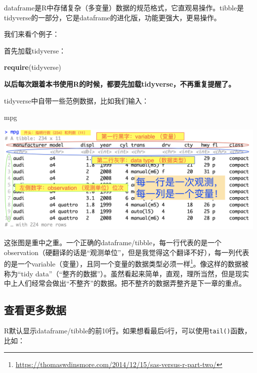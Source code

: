 \documentclass[]{book}
\newenvironment{Shaded}{\begin{snugshade}}{\end{snugshade}}
\newcommand{\KeywordTok}[1]{\textcolor[rgb]{0.13,0.29,0.53}{\textbf{#1}}}
\newcommand{\NormalTok}[1]{#1}
\let\rmarkdownfootnote\footnote%
\def\footnote{\protect\rmarkdownfootnote}
\begin{document}
dataframe是R中存储复杂（多变量）数据的规范格式，它直观易操作。tibble是tidyverse的一部分，它是dataframe的进化版，功能更强大，更易操作。

我们来看个例子：

首先加载tidyverse：

\begin{Shaded}
\begin{Highlighting}[]
\KeywordTok{require}\NormalTok{(tidyverse)}
\end{Highlighting}
\end{Shaded}

\textbf{以后每次跟着本书使用R的时候，都要先加载tidyverse，不再重复提醒了。}

tidyverse中自带一些范例数据，比如我们输入：

\begin{Shaded}
\begin{Highlighting}[]
\NormalTok{mpg}
\end{Highlighting}
\end{Shaded}

\includegraphics[width=35.53in]{img/tibble-intro}

这张图是重中之重。一个正确的dataframe/tibble，每一行代表的是一个observation（硬翻译的话是``观测单位''，但是我觉得这个翻译不好），每一列代表的是一个variable（变量），且同一个变量的数据类型必须一样\footnote{\url{https://thomaswdinsmore.com/2014/12/15/sas-versus-r-part-two/}}。像这样的数据被称为``tidy data''（``整齐的数据''）。虽然看起来简单，直观，理所当然，但是现实中上人们经常会做出``不整齐''的数据。把不整齐的数据弄整齐是下一章的重点。

\hypertarget{tibble-more-data}{%
\subsection{查看更多数据}\label{tibble-more-data}}

R默认显示dataframe/tibble的前10行。如果想看最后6行，可以使用\texttt{tail()}函数，比如：
\end{document}
